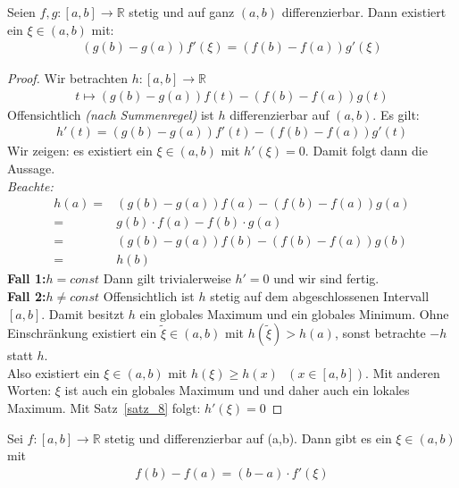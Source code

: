 
\begin{Satz}{
	\label{satz_9}
	Seien $f,g : [a,b] \rightarrow \mathbb{R}$ stetig und auf ganz 
	$\left( a, b \right)$ differenzierbar. Dann existiert ein 
	$\xi \in (a,b) $ mit:
	\begin{align*}
		\left( g(b)- g(a)\right)f'(\xi) = 
		\left( f(b) - f(a) \right) g'(\xi)
	\end{align*}
}\end{Satz}

\begin{proof}
	Wir betrachten $h: [a,b] \rightarrow \mathbb{R}$ 
	\begin{align*}
		t \mapsto \left( g(b) -g(a)\right)f(t) - \left(f(b)-f(a)\right)g(t)
	\end{align*}
	Offensichtlich \emph{(nach Summenregel)} ist $h$ differenzierbar auf $(a,b)$.
	Es gilt:
	\begin{align*}
		h'(t) = \left(g(b)-g(a)\right)f'(t) - \left(f(b)-f(a)\right)g'(t)
	\end{align*}
	Wir zeigen: es existiert ein $\xi \in (a,b)$ mit $h'(\xi) = 0$. Damit folgt 
	dann die Aussage. \\
	\emph{Beachte:} 
	\begin{align*}
		h(a) = & \left(g(b)-g(a)\right)f(a) - \left(f(b)-f(a)\right)g(a) \\
		= & g(b) \cdot f(a) - f(b) \cdot g(a) \\
		= & \left(g(b) - g(a)\right)f(b) - \left(f(b)-f(a)\right)g(b) \\
		= & h(b)
	\end{align*}
	\textbf{Fall 1:}$h = const$ Dann gilt trivialerweise $h' = 0$ 
	und wir sind fertig. \\
	\textbf{Fall 2:}$h \neq const$ Offensichtlich ist $h$ stetig auf dem 
	abgeschlossenen Intervall $[a,b]$. Damit besitzt $h$ ein globales Maximum und 
	ein globales Minimum. Ohne Einschränkung existiert ein $\tilde{\xi} \in (a,b)$
	 mit $h(\tilde{\xi}) > h(a)$, sonst betrachte $-h$ statt $h$. \\
	 Also existiert ein $\xi \in (a,b)$ mit $h(\xi) \geq h(x)\textbf{ }
	  (x \in [a,b])$. 
	 Mit anderen Worten: $\xi$ ist auch ein globales Maximum und und daher auch 
	 ein lokales Maximum. Mit Satz~\ref{satz_8}
	 folgt: $h'(\xi) = 0$
	 
\end{proof}
	
\begin{Satz}{\label{vl_07_MWS}
	Sei $f: [a,b] \rightarrow \mathbb{R}$ stetig und differenzierbar auf 
	(a,b). Dann gibt es ein $\xi \in (a,b)$ mit 
	\begin{align*}
		f(b) -f(a) = (b-a) \cdot f'(\xi)
	\end{align*}
}\end{Satz}

